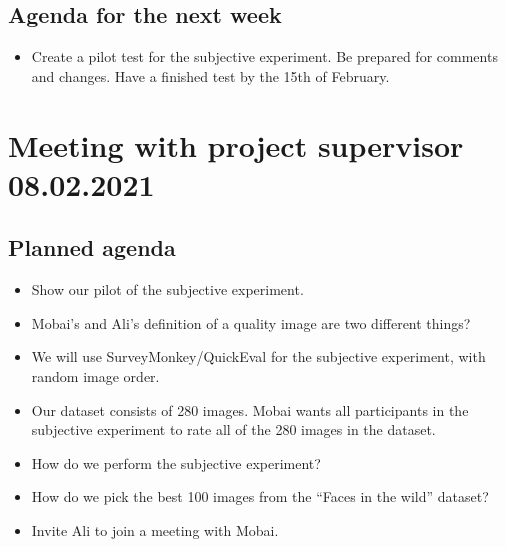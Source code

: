 \subsection*{Agenda for the next week}
\begin{itemize}
    \item Create a pilot test for the subjective experiment. Be prepared for comments and changes. Have a finished test by the 15th of February.
\end{itemize}



\section*{Meeting with project supervisor 08.02.2021}
\subsection*{Planned agenda}
\begin{itemize}
    \item Show our pilot of the subjective experiment.
    \item Mobai’s and Ali’s definition of a quality image are two different things? 
    \item We will use SurveyMonkey/QuickEval for the subjective experiment, with random image order. 
    \item Our dataset consists of 280 images. Mobai wants all participants in the subjective experiment to rate all of the 280 images in the dataset.
    \item How do we perform the subjective experiment?
    \item How do we pick the best 100 images from the “Faces in the wild” dataset?
    \item Invite Ali to join a meeting with Mobai.
\end{itemize}

